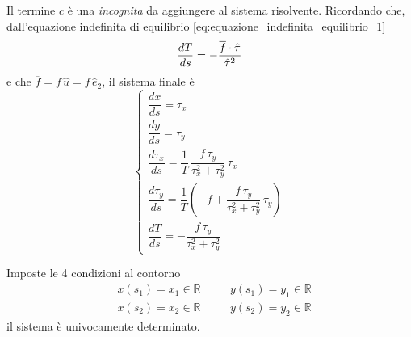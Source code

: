 Il termine $c$ è una \emph{incognita} da aggiungere al sistema risolvente. Ricordando che, dall'equazione indefinita di equilibrio \eqref{eq:equazione_indefinita_equilibrio_1}
\[
	\dfrac{dT}{ds} = -\dfrac{\overline{f}\cdot\hat{\tau}}{\hat{\tau}^2}
\]
e che $\overline{f} = f\,\hat{u} = f\,\hat{e}_2$, il sistema finale è
\[
	\begin{cases}
\dfrac{dx}{ds} = \tau_x\\[1.5ex]
\dfrac{dy}{ds} = \tau_y\\[1.5ex]
\dfrac{d\tau_x}{ds} = \dfrac{1}{T}\,\dfrac{f\,\tau_y}{\tau_x^2 + \tau_y^2}\,\tau_x\\[1.5ex]
\dfrac{d\tau_y}{ds} = \dfrac{1}{T}\left(-f+\dfrac{f\,\tau_y}{\tau_x^2 + \tau_y^2}\,\tau_y\right)\\[1.5ex]
\dfrac{dT}{ds} = -\dfrac{f\,\tau_y}{\tau_x^2 + \tau_y^2}
	\end{cases}
\]

Imposte le 4 condizioni al contorno
\begin{align*}
	&x(s_1) = x_1\in\mathbb{R} \quad &&y(s_1) = y_1\in\mathbb{R}\\
	&x(s_2) = x_2\in\mathbb{R} \quad &&y(s_2) = y_2\in\mathbb{R}
\end{align*}
il sistema è univocamente determinato.
